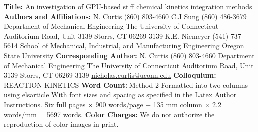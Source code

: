 \documentclass[preprint]{elsarticle}
\begin{document}
\begin{titlepage}
\parbox{\linewidth}{
\begin{flushleft}
\textbf{Title:}\linebreak
An investigation of GPU-based stiff chemical kinetics integration methods
\linebreak
\linebreak
\textbf{Authors and Affiliations:} \linebreak\linebreak
  N.  Curtis	(860) 803-4660 \linebreak
  C.J Sung	(860) 486-3679 \linebreak
  Department of Mechanical Engineering \linebreak
  The University of Connecticut  Auditorium Road, Unit 3139 \linebreak
  Storrs, CT 06269-3139 \linebreak
  \linebreak
  K.E. Niemeyer	(541) 737-5614 \linebreak
  School of Mechanical, Industrial, and Manufacturing Engineering\linebreak
  Oregon State University\linebreak
\linebreak
\textbf{Corresponding Author:}\linebreak
  N. Curtis\linebreak
  (860) 803-4660 \linebreak
  Department of Mechanical Engineering\linebreak
  The University of Connecticut  Auditorium Road, Unit 3139 \linebreak
  Storrs, CT 06269-3139 \linebreak
  \href{mailto:nicholas.curtis@uconn.edu}{nicholas.curtis@uconn.edu}\linebreak
\linebreak
\textbf{Colloquium:}\linebreak
REACTION KINETICS\linebreak
\linebreak
\textbf{Word Count:}\linebreak
Method 2\linebreak
Formatted into two columns using elsarticle\linebreak
With font sizes and spacing as specified in the Latex Author Instructions.\linebreak
Six full pages $\times$ 900 words/page + 135 mm column $\times$ 2.2 words/mm = 5697 words.\linebreak
\textbf{Color Charges:}\linebreak
We do not authorize the reproduction of color images in print.
\end{flushleft}
}
\end{titlepage}
\end{document}
